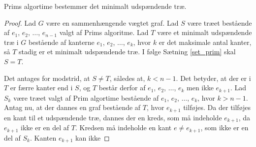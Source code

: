 \begin{thm}
Prims algortime bestemmer det minimalt udspændende træ. 
\label{set_prim}
\end{thm}

\begin{proof}
Lad $G$ være en sammenhængende vægtet graf. Lad $S$ være træet bestående af $e_1$, $e_2$, $\ldots$, $e_{n-1}$ valgt af Prims algoritme. Lad $T$ være et minimalt udspændende træ i $G$ bestående af kanterne $e_1$, $e_2$, $\ldots$, $e_k$, hvor $k$ er det maksimale antal kanter, så $T$ stadig er et minimalt udspændende træ. I følge Sætning \ref{set_prim} skal $S=T$. 

Det antages for modstrid, at $S \neq T$, således at, $k<n-1$. Det betyder, at der er i $T$ er færre kanter end i $S$, og $T$ består derfor af $e_1$, $e_2$, $\ldots$, $e_k$ men ikke $e_{k+1}$. Lad $S_k$ være træet valgt af Prim algortime bestående af $e_1$, $e_2$, $\ldots$, $e_k$, hvor $k>n-1$. Antag nu, at der dannes en graf bestående af $T$, hvor $e_{k+1}$ tilføjes. Da der tilføjes en kant til et udspændende træ, dannes der en kreds, som må indeholde $e_{k+1}$, da $e_{k+1}$ ikke er en del af $T$. Kredsen må indeholde en kant $e \neq e_{k+1}$, som ikke er en del af $S_k$. Kanten $e_{k+1}$ kan ikke 

 
\end{proof}